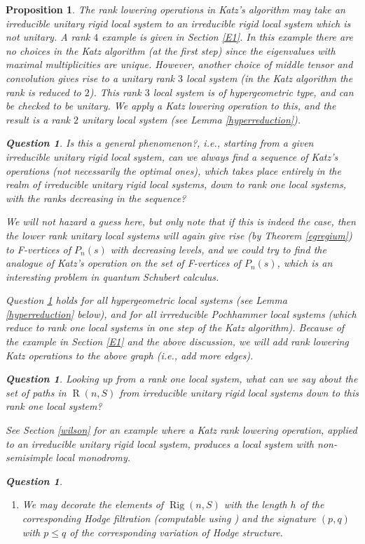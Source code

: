 \documentclass[11pt]{amsart}
\newcommand\op{\operatorname}
\newtheorem{question}[theorem]{Question}
\newtheorem{proposition}[theorem]{Proposition}
\numberwithin{theorem}{subsection}
\begin{document}
{\begin{proposition}
The rank lowering operations in Katz's algorithm may take an irreducible unitary rigid local system
to an irreducible rigid local system which is not unitary. A rank $4$ example  is given in Section \ref{E1}. In this example there  are no choices in the Katz algorithm (at the first step) since the eigenvalues with maximal multiplicities are unique. However, another  choice of middle tensor and convolution gives rise  to a unitary rank $3$ local system (in the Katz algorithm the rank is reduced to $2$). This rank $3$ local system is of hypergeometric type, and can be checked to be unitary. We apply a Katz lowering operation to this, and the result is a rank $2$ unitary local system (see Lemma \ref{hyperreduction}).
\begin{question}\label{genphen}
Is this a general phenomenon?, i.e., starting from a given irreducible unitary rigid local system, can we always find a sequence of Katz's operations (not necessarily the optimal ones), which  takes place entirely in the realm of irreducible unitary rigid local systems, down to rank one local systems, with the ranks decreasing in the sequence?
\end{question}
We will not hazard a guess here, but only note that if this is indeed the case, then the lower rank unitary local systems will again give rise (by Theorem \ref{egregium}) to F-vertices of $P_n(s)$ with decreasing levels, and we could try to find the analogue of Katz's operation on the set of F-vertices of $P_n(s)$, which is an interesting problem in quantum Schubert calculus.

 Question \ref{genphen} holds  for all hypergeometric local systems (see Lemma \ref{hyperreduction} below), and for all  irrreducible Pochhammer local systems (which reduce to rank one local systems in one step of the Katz algorithm).  Because of  the example  in Section \ref{E1} and the above discussion, we will add rank lowering Katz operations to the above graph (i.e., add more edges).
 \begin{question}\label{information}
Looking up from a rank one local system, what can we say about the set of paths in  $\op{R}(n,S)$ from  irreducible unitary rigid local systems down to this rank one local system?
\end{question}

See Section \ref{wilson} for an example where a Katz rank lowering operation, applied to an irreducible unitary rigid local system, produces a local system with non-semisimple local monodromy.

\begin{question}\label{Q2}
\hspace{2em}
\begin{enumerate}
\item[(A)] We may decorate the elements of  $\op{Rig}(n,S)$ with the length $h$ of the corresponding Hodge filtration  (computable using \cite{DS}) and the signature $(p,q)$ with $p\leq q$ of the corresponding variation of Hodge structure.


\end{enumerate}
\end{question}
\end{proposition}}
\end{document}
